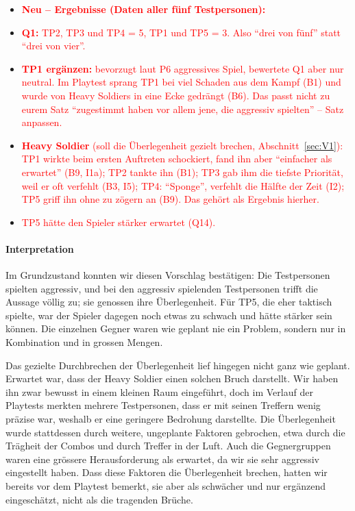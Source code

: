 \documentclass[../Main.tex]{subfiles}
\begin{document}
\begin{itemize}[leftmargin=1.5cm]
    \item \textcolor{red}{\textbf{Neu -- Ergebnisse (Daten aller fünf Testpersonen):}}
    \item \textcolor{red}{\textbf{Q1:} TP2, TP3 und TP4 = 5, TP1 und TP5 = 3. Also \enquote{drei von fünf} statt \enquote{drei von vier}.}
    \item \textcolor{red}{\textbf{TP1 ergänzen:} bevorzugt laut P6 aggressives Spiel, bewertete Q1 aber nur neutral. Im Playtest sprang TP1 bei viel Schaden aus dem Kampf (B1) und wurde von Heavy Soldiers in eine Ecke gedrängt (B6). Das passt nicht zu eurem Satz \enquote{zugestimmt haben vor allem jene, die aggressiv spielten} -- Satz anpassen.}
    \item \textcolor{red}{\textbf{Heavy Soldier} (soll die Überlegenheit gezielt brechen, Abschnitt~\ref{sec:V1}): TP1 wirkte beim ersten Auftreten schockiert, fand ihn aber \enquote{einfacher als erwartet} (B9, I1a); TP2 tankte ihn (B1); TP3 gab ihm die tiefste Priorität, weil er oft verfehlt (B3, I5); TP4: \enquote{Sponge}, verfehlt die Hälfte der Zeit (I2); TP5 griff ihn ohne zu zögern an (B9). Das gehört als Ergebnis hierher.}
    \item \textcolor{red}{TP5 hätte den Spieler stärker erwartet (Q14).}
\end{itemize}

\paragraph{Interpretation}
Im Grundzustand konnten wir diesen Vorschlag bestätigen: Die Testpersonen spielten aggressiv, und bei den aggressiv spielenden Testpersonen trifft die Aussage völlig zu; sie genossen ihre Überlegenheit. Für TP5, die eher taktisch spielte, war der Spieler dagegen noch etwas zu schwach und hätte stärker sein können. Die einzelnen Gegner waren wie geplant nie ein Problem, sondern nur in Kombination und in grossen Mengen.

Das gezielte Durchbrechen der Überlegenheit lief hingegen nicht ganz wie geplant. Erwartet war, dass der Heavy Soldier einen solchen Bruch darstellt. Wir haben ihn zwar bewusst in einem kleinen Raum eingeführt, doch im Verlauf der Playtests merkten mehrere Testpersonen, dass er mit seinen Treffern wenig präzise war, weshalb er eine geringere Bedrohung darstellte. Die Überlegenheit wurde stattdessen durch weitere, ungeplante Faktoren gebrochen, etwa durch die Trägheit der Combos und durch Treffer in der Luft. Auch die Gegnergruppen waren eine grössere Herausforderung als erwartet, da wir sie sehr aggressiv eingestellt haben. Dass diese Faktoren die Überlegenheit brechen, hatten wir bereits vor dem Playtest bemerkt, sie aber als schwächer und nur ergänzend eingeschätzt, nicht als die tragenden Brüche.
\end{document}
